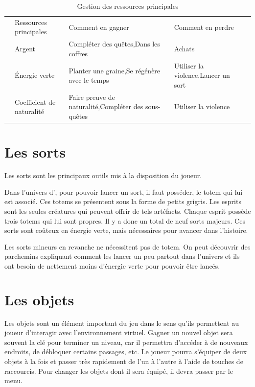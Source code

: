 \begin{table}[ht!]
	\begin{tabu} to \textwidth {l X X[1.2] X[1.2] l}
		& Ressources principales & Comment en gagner & Comment en perdre & \\
		& Argent & Compléter des quêtes,\newline Dans les coffres & Achats & \\
		& Énergie verte & Planter une graine,\newline Se régénère avec le temps & Utiliser la violence,\newline Lancer un sort & \\
		& Coefficient de naturalité & Faire preuve de naturalité,\newline Compléter des sous-quêtes & Utiliser la violence & \\
	\end{tabu}
	\caption{Gestion des ressources principales}
\end{table}

\section{Les sorts}
\label{sec:sorts}
Les sorts sont les principaux outils mis à la disposition du joueur.

Dans l'univers d'\nomUnivers, pour pouvoir lancer un sort, il faut posséder, le totem qui lui est associé. Ces totems se présentent sous la forme de petits grigris. Les esprits sont les seules créatures qui peuvent offrir de tels artéfacts. Chaque esprit possède trois totems qui lui sont propres. Il y a donc un total de neuf sorts majeurs. Ces sorts sont coûteux en énergie verte, mais nécessaires pour avancer dans l'histoire.

Les sorts mineurs en revanche ne nécessitent pas de totem. On peut découvrir des parchemins expliquant comment les lancer un peu partout dans l'univers et ils ont besoin de nettement moins d'énergie verte pour pouvoir être lancés.


\section{Les objets}
Les objets sont un élément important du jeu dans le sens qu'ils permettent au joueur d'interagir avec l'environnement virtuel. Gagner un nouvel objet sera souvent la clé pour terminer un niveau, car il permettra d'accéder à de nouveaux endroits, de débloquer certains passages, etc. Le joueur pourra s'équiper de deux objets à la fois et passer très rapidement de l'un à l'autre à l'aide de touches de raccourcis. Pour changer les objets dont il sera équipé, il devra passer par le menu.

